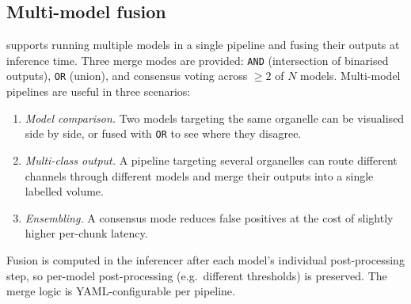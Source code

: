 \subsection*{Multi-model fusion}

\cellmapflow{} supports running multiple models in a single pipeline and fusing their outputs at inference time. Three merge modes are provided: \texttt{AND} (intersection of binarised outputs), \texttt{OR} (union), and consensus voting across $\geq 2$ of $N$ models. Multi-model pipelines are useful in three scenarios:

\begin{enumerate}
\item \emph{Model comparison.} Two models targeting the same organelle can be visualised side by side, or fused with \texttt{OR} to see where they disagree.
\item \emph{Multi-class output.} A pipeline targeting several organelles can route different channels through different models and merge their outputs into a single labelled volume.
\item \emph{Ensembling.} A consensus mode reduces false positives at the cost of slightly higher per-chunk latency.
\end{enumerate}

Fusion is computed in the inferencer after each model's individual post-processing step, so per-model post-processing (e.g.\ different thresholds) is preserved. The merge logic is YAML-configurable per pipeline.
